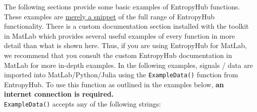 \documentclass[12pt, a4paper, titlepage, openany]{book}
\begin{document}
The following sections provide some basic examples of EntropyHub functions. These examples are \ul{merely a snippet} of the full range of EntropyHub functionality.\newline \newline
\noindent  There is a custom documentation section installed with the toolkit in MatLab which provides several useful examples of every function in more detail than what is shown here.  Thus, if you are using EntropyHub for MatLab, we recommend that you consult the custom EntropyHub documentation in MatLab for more in-depth examples.
\newline \newline
In the following examples, signals / data are imported into MatLab/Python/Julia using the \texttt{ExampleData()} function from EntropyHub.
To use this function as outlined in the examples below, \textbf{an internet connection is required.}\\
\texttt{ExampleData()} accepts any of the following strings:
\end{document}

